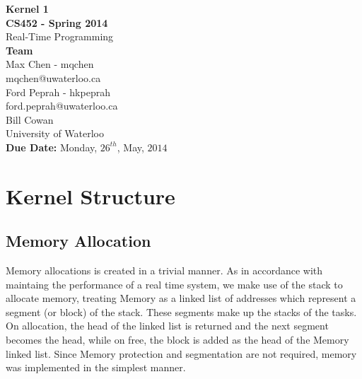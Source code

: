 \documentclass[12pt]{article}
\begin{document}
\begin{center}
  {\bf\Large Kernel 1}\\
  {\bf\large CS452 - Spring 2014}\\
  Real-Time Programming\vspace{5cm}\\
  {\bf Team }\\
  Max Chen - mqchen\\
  mqchen@uwaterloo.ca\\[1\baselineskip]
  Ford Peprah - hkpeprah\\
  ford.peprah@uwaterloo.ca\vspace{5cm}\\
  Bill Cowan\\
  University of Waterloo\\
  {\bf Due Date:} Monday, $26^{th}$, May, $2014$
\end{center}
\newpage
\tableofcontents
\newpage
\section{Kernel Structure}
\subsection{Memory Allocation}
Memory allocations is created in a trivial manner.  As in accordance with maintaing the performance of a real time system, we make use of the stack to allocate memory, treating Memory as a linked list of addresses which represent a segment (or block) of the stack.  These segments make up the stacks of the tasks.  On allocation, the head of the linked list is returned and the next segment becomes the head, while on free, the block is added as the head of the Memory linked list.  Since Memory protection and segmentation are not required, memory was implemented in the simplest manner.
\\[1\baselineskip]
\end{document}
